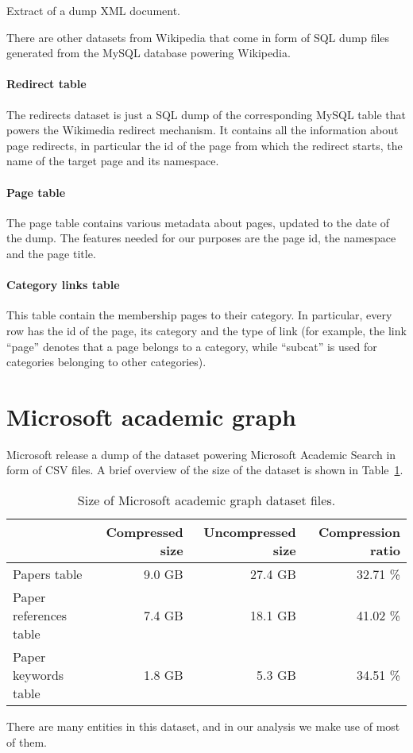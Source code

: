 \begin{listing}[]
    \inputminted[breaklines=true]{xml}{assets/page_xml_extract.xml}
    \caption{Extract of a dump XML document.}
    \label{lst:page_xml_extract}
\end{listing}

There are other datasets from Wikipedia that come in form of SQL dump files generated from the MySQL database powering Wikipedia.
\paragraph{Redirect table}
The redirects dataset is just a SQL dump of the corresponding MySQL table that powers the Wikimedia redirect mechanism.
It contains all the information about page redirects, in particular the id of the page from which the redirect starts, the name of the target page and its namespace.

\paragraph{Page table}
The page table contains various metadata about pages, updated to the date of the dump.
The features needed for our purposes are the page id, the namespace and the page title.

\paragraph{Category links table}
This table contain the membership pages to their category.
In particular, every row has the id of the page, its category and the type of link (for example, the link ``page'' denotes that a page belongs to a category, while ``subcat'' is used for categories belonging to other categories).

\section{Microsoft academic graph}
\label{sec:mag_dataset}
Microsoft release a dump of the dataset powering Microsoft Academic Search in form of CSV files.
A brief overview of the size of the dataset is shown in Table~\ref{tbl:mag_size}.
\begin{table}[]
\centering
\caption{Size of Microsoft academic graph dataset files.}
\label{tbl:mag_size}
\begin{tabular}{@{}lrrr@{}}
\multicolumn{1}{c}{\textbf{}} & \textbf{Compressed size} & \textbf{Uncompressed size} & \textbf{Compression ratio} \\ \midrule
Papers table                &      9.0 GB &    27.4 GB & 32.71 \% \\
Paper references table      &      7.4 GB &    18.1 GB & 41.02 \% \\
Paper keywords table        &      1.8 GB &     5.3 GB & 34.51 \%
\end{tabular}
\end{table}
There are many entities in this dataset, and in our analysis we make use of most of them.


